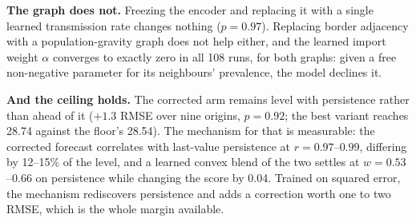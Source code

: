 \textbf{The graph does not.} Freezing the encoder and replacing it with a single
learned transmission rate changes nothing ($p = 0.97$). Replacing border
adjacency with a population-gravity graph does not help either, and the learned
import weight $\alpha$ converges to exactly zero in all 108 runs, for both
graphs: given a free non-negative parameter for its neighbours' prevalence, the
model declines it.

\textbf{And the ceiling holds.} The corrected arm remains level with persistence
rather than ahead of it ($+1.3$ RMSE over nine origins, $p = 0.92$; the best
variant reaches 28.74 against the floor's 28.54). The mechanism for that is
measurable: the corrected forecast correlates with last-value persistence at
$r = 0.97$--$0.99$, differing by 12--15\% of the level, and a learned convex
blend of the two settles at $w = 0.53$--$0.66$ on persistence while changing the
score by 0.04. Trained on squared error, the mechanism rediscovers persistence
and adds a correction worth one to two RMSE, which is the whole margin available.

